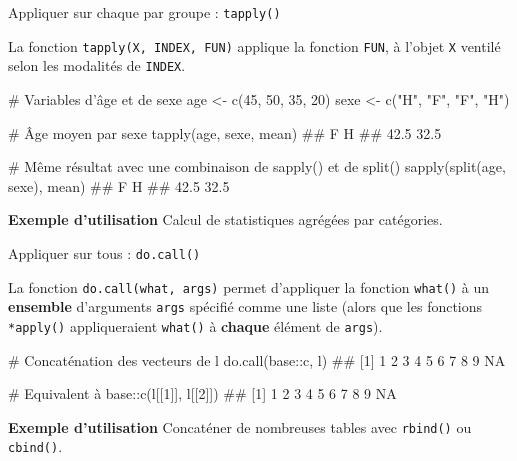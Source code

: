 \documentclass[12pt,ignorenonframetext,]{beamer}
\newenvironment{Shaded}{}{}
\newcommand{\KeywordTok}[1]{\textcolor[rgb]{0.00,0.00,1.00}{#1}}
\newcommand{\DecValTok}[1]{#1}
\newcommand{\StringTok}[1]{\textcolor[rgb]{0.00,0.50,0.50}{#1}}
\newcommand{\CommentTok}[1]{\textcolor[rgb]{0.00,0.50,0.00}{#1}}
\newcommand{\OperatorTok}[1]{#1}
\newcommand{\NormalTok}[1]{#1}
\renewenvironment{Shaded}{\begin{snugshade}}{\end{snugshade}}
\begin{document}
\begin{frame}[fragile]{\large Appliquer sur chaque par groupe :
\texttt{tapply()}}

La fonction \texttt{tapply(X,\ INDEX,\ FUN)} applique la fonction
\texttt{FUN}, à l'objet \texttt{X} ventilé selon les modalités de
\texttt{INDEX}.

\footnotesize \pause

\begin{Shaded}
\begin{Highlighting}[]
\CommentTok{# Variables d'âge et de sexe}
\NormalTok{age <-}\StringTok{ }\KeywordTok{c}\NormalTok{(}\DecValTok{45}\NormalTok{, }\DecValTok{50}\NormalTok{, }\DecValTok{35}\NormalTok{, }\DecValTok{20}\NormalTok{)}
\NormalTok{sexe <-}\StringTok{ }\KeywordTok{c}\NormalTok{(}\StringTok{"H"}\NormalTok{, }\StringTok{"F"}\NormalTok{, }\StringTok{"F"}\NormalTok{, }\StringTok{"H"}\NormalTok{)}

\CommentTok{# Âge moyen par sexe}
\KeywordTok{tapply}\NormalTok{(age, sexe, mean)}
\NormalTok{  ##    F    H }
\NormalTok{  ## 42.5 32.5}

\CommentTok{# Même résultat avec une combinaison de sapply() et de split()}
\KeywordTok{sapply}\NormalTok{(}\KeywordTok{split}\NormalTok{(age, sexe), mean)}
\NormalTok{  ##    F    H }
\NormalTok{  ## 42.5 32.5}
\end{Highlighting}
\end{Shaded}

\normalsize \pause \vspace{-0.2cm}

\textbf{Exemple d'utilisation} Calcul de statistiques agrégées par
catégories.

\end{frame}

\begin{frame}[fragile]{\large Appliquer sur tous : \texttt{do.call()}}

La fonction \texttt{do.call(what,\ args)} permet d'appliquer la fonction
\texttt{what()} à un \textbf{ensemble} d'arguments \texttt{args}
spécifié comme une liste (alors que les fonctions \texttt{*apply()}
appliqueraient \texttt{what()} à \textbf{chaque} élément de
\texttt{args}).

\pause \small

\begin{Shaded}
\begin{Highlighting}[]
\CommentTok{# Concaténation des vecteurs de l}
\KeywordTok{do.call}\NormalTok{(base}\OperatorTok{::}\NormalTok{c, l)}
\NormalTok{  ##  [1]  1  2  3  4  5  6  7  8  9 NA}

\CommentTok{# Equivalent à }
\NormalTok{base}\OperatorTok{::}\KeywordTok{c}\NormalTok{(l[[}\DecValTok{1}\NormalTok{]], l[[}\DecValTok{2}\NormalTok{]])}
\NormalTok{  ##  [1]  1  2  3  4  5  6  7  8  9 NA}
\end{Highlighting}
\end{Shaded}

\pause \normalsize

\textbf{Exemple d'utilisation} Concaténer de nombreuses tables avec
\texttt{rbind()} ou \texttt{cbind()}.

\end{frame}
\end{document}

